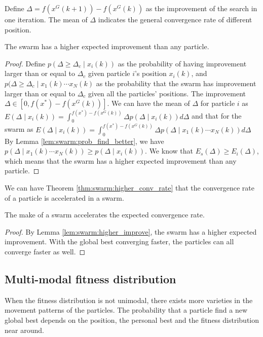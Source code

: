 Define $ \Delta = f(x^{G}(k+1)) - f(x^{G}(k)) $ as the improvement of the search in one iteration.
The mean of $ \Delta $ indicates the general convergence rate of different position.

\begin{mylem}
\label{lem:swarm:higher_improve}
The swarm has a higher expected improvement than any particle.
\begin{proof}
Define $ p( \Delta \geq \Delta_{c} \mid  x_{i}(k) ) $ as the probability of having improvement larger than or equal to $ \Delta_{c} $ given particle $ i $'s position $ x_{i}(k) $,
and $ p( \Delta \geq \Delta_{c} \mid x_{1}(k) \cdots x_{N}(k ) $ as the probability that the swarm has improvement larger than or equal to $ \Delta_{c} $ given all the particles' positions.
The improvement $ \Delta \in [0, f(x^{*}) - f(x^{G}(k))] $.
We can have the mean of $ \Delta $ for particle $ i $ as
$ E( \Delta \mid x_{i}(k) ) =  \int_{0}^{ f(x^{*}) - f(x^{G}(k)) } \Delta p( \Delta \mid  x_{i}(k) ) d \Delta $
and that for the swarm as 
$ E( \Delta \mid x_{i}(k) ) =  \int_{0}^{ f(x^{*}) - f(x^{G}(k)) } \Delta p( \Delta \mid  x_{1}(k) \cdots x_{N}(k) ) d \Delta $
By Lemma \ref{lem:swarm:prob_find_better}, we have $ p( \Delta \mid  x_{1}(k) \cdots x_{N}(k) ) \geq  p( \Delta \mid  x_{i}(k) ) $.
We know that $ E_{s} ( \Delta ) \geq E_{i} ( \Delta )  $, which means that the swarm has a higher expected improvement than any particle.
\end{proof}
\end{mylem}

We can have Theorem \ref{thm:swarm:higher_conv_rate} that the convergence rate of a particle is accelerated in a swarm.

\begin{mythm}
\label{thm:swarm:higher_conv_rate}
The make of a swarm accelerates the expected convergence rate.
\begin{proof}
By Lemma \ref{lem:swarm:higher_improve}, the swarm has a higher expected improvement.
With the global best converging faster, the particles can all converge faster as well.
\end{proof}
\end{mythm}

\subsection{Multi-modal fitness distribution}

When the fitness distribution is not unimodal, there exists more varieties in the movement patterns of the particles.
The probability that a particle find a new global best depends on the position, the personal best and the fitness distribution near around.

